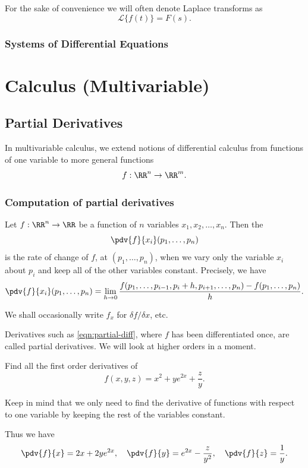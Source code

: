 \begin{notation}
For the sake of convenience we will often denote Laplace transforms as
\[ \mathcal{L}\{{f(t)}\}=F(s). \]
\end{notation}

\section{Systems of Differential Equations}
\pagebreak

\part{Calculus (Multivariable)}
\chapter{Partial Derivatives}
In multivariable calculus, we extend notions of differential calculus from functions of one variable to more general functions
\[ f:\RR^n\to\RR^m. \]

\section{Computation of partial derivatives}
Let $f:\RR^n\to\RR$ be a function of $n$ variables $x_1,x_2,\dots,x_n$. Then the 
\[ \pdv{f}{x_i}(p_1,\dots,p_n) \]
is the rate of change of $f$, at $(p_1,\dots,p_n)$, when we vary only the variable $x_i$ about $p_i$ and keep all of the other variables constant. Precisely, we have
\begin{equation}\label{eqn:partial-diff}
\pdv{f}{x_i}(p_1,\dots,p_n)=\lim_{h\to0}\frac{f(p_1,\dots,p_{i-1},p_i+h,p_{i+1},\dots,p_n)-f(p_1,\dots,p_n)}{h}.
\end{equation}

\begin{notation}
We shall occasionally write $f_x$ for $\delta f/\delta x$, etc.
\end{notation}

Derivatives such as \cref{eqn:partial-diff}, where $f$ has been differentiated once, are called  partial derivatives. We will look at higher orders in a moment.

\begin{exercise}{}{}
Find all the first order derivatives of
\[ f(x,y,z)=x^2+ye^{2x}+\frac{z}{y}. \]
\end{exercise}

\begin{solution}
Keep in mind that we only need to find the derivative of functions with respect to one variable by keeping the rest of the variables constant.

Thus we have
\[ \pdv{f}{x}=2x+2ye^{2x}, \quad \pdv{f}{y}=e^{2x}-\frac{z}{y^2}, \quad \pdv{f}{z}=\frac{1}{y}. \]
\end{solution}


